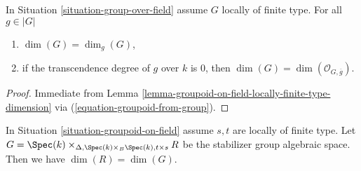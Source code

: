\begin{lemma}
\label{lemma-group-over-field-locally-finite-type-dimension}
In
Situation \ref{situation-group-over-field}
assume $G$ locally of finite type.
For all $g \in |G|$
\begin{enumerate}
\item $\dim(G) = \dim_g(G)$,
\item if the transcendence degree of $g$ over $k$ is $0$, then
$\dim(G) = \dim(\mathcal{O}_{G, \overline{g}})$.
\end{enumerate}
\end{lemma}

\begin{proof}
Immediate from
Lemma \ref{lemma-groupoid-on-field-locally-finite-type-dimension}
via (\ref{equation-groupoid-from-group}).
\end{proof}

\begin{lemma}
\label{lemma-groupoid-on-field-dimension-equal-stabilizer}
In
Situation \ref{situation-groupoid-on-field}
assume $s, t$ are locally of finite type.
Let
$G = \Spec(k)
\times_{\Delta, \Spec(k) \times_B \Spec(k), t \times s} R$
be the stabilizer group algebraic space.
Then we have $\dim(R) = \dim(G)$.
\end{lemma}

